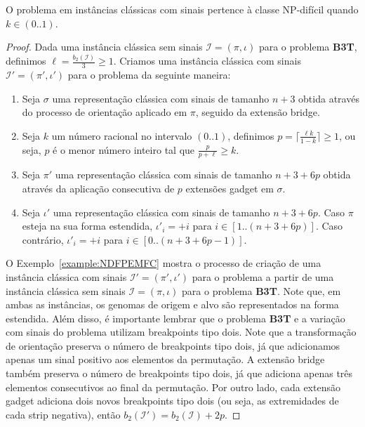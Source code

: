 \begin{theorem}\label{theorem:NSWQYFLG}
O problema \SbPRT{} em instâncias clássicas com sinais pertence à classe NP-difícil quando $k \in (0..1)$.
\end{theorem}
\begin{proof}
Dada uma instância clássica sem sinais $\mathcal{I}=(\pi,\iota)$ para o problema \textbf{B3T}, definimos $\ell = \frac{b_2(\mathcal{I})}{3} \ge 1$. Criamos uma instância clássica com sinais $\mathcal{I'}=(\pi',\iota')$ para o problema \SbPRT{} da seguinte maneira:

\begin{enumerate}
  \item Seja $\sigma$ uma representação clássica com sinais de tamanho $n+3$ obtida através do processo de orientação aplicado em $\pi$, seguido da extensão bridge.
  \item Seja $k$ um número racional no intervalo $(0..1)$, definimos $p = \lceil\frac{\ell k}{1-k}\rceil \ge 1$, ou seja, $p$ é o menor número inteiro tal que $\frac{p}{p+\ell} \ge k$.
  \item Seja $\pi'$ uma representação clássica com sinais de tamanho $n+3+6p$ obtida através da aplicação consecutiva de $p$ extensões gadget em $\sigma$.
  \item Seja $\iota'$ uma representação clássica com sinais de tamanho $n+3+6p$. Caso $\pi$ esteja na sua forma estendida, $\iota'_i = +i$ para $i \in [1..(n+3+6p)]$. Caso contrário,  $\iota'_i = +i$ para $i \in [0..(n+3+6p-1)]$.
\end{enumerate}

O Exemplo~\ref{example:NDFPEMFC} mostra o processo de criação de uma instância clássica com sinais $\mathcal{I'}=(\pi',\iota')$ para o problema \SbPRT{} a partir de uma instância clássica sem sinais $\mathcal{I}=(\pi,\iota)$ para o problema \textbf{B3T}. Note que, em ambas as instâncias, os genomas de origem e alvo são representados na forma estendida. Além disso, é importante lembrar que o problema \textbf{B3T} e a variação com sinais do problema \SbPRT{} utilizam breakpoints tipo dois. Note que a transformação de orientação preserva o número de breakpoints tipo dois, já que adicionamos apenas um sinal positivo aos elementos da permutação. A extensão bridge também preserva o número de breakpoints tipo dois, já que adiciona apenas três elementos consecutivos ao final da permutação. Por outro lado, cada extensão gadget adiciona dois novos breakpoints tipo dois (ou seja, as extremidades de cada strip negativa), então $b_2(\mathcal{I'}) = b_2(\mathcal{I}) +2p$.


\end{proof}

